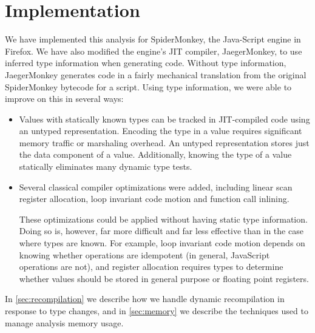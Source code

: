 
\section{Implementation}
\label{sec:implementation}

We have implemented this analysis for SpiderMonkey, the Java-Script engine
in Firefox.
We have also modified the engine's JIT compiler, JaegerMonkey, to use
inferred type information when generating code.
Without type information, JaegerMonkey generates code in a fairly mechanical
translation from the original SpiderMonkey bytecode for a script.
Using type information, we were able to improve on this in several ways:

\begin{itemize}

\item Values with statically known types can be tracked in JIT-compiled code
using an untyped representation.
Encoding the type in a value requires significant memory traffic or
marshaling overhead.
An untyped representation stores just the data component of a value.
Additionally, knowing the type of a value statically eliminates many
dynamic type tests.

\item Several classical compiler optimizations were added,
including linear scan register allocation, loop invariant code motion
and function call inlining.

These optimizations could be applied without
having static type information.
Doing so is, however, far more difficult and far less effective than in
the case where types are known. For example, loop invariant code motion depends
on knowing whether operations
are idempotent (in general, JavaScript operations are not),
and register allocation requires types to determine whether values should
be stored in general purpose or floating point registers.

\end{itemize}

In \Section\ref{sec:recompilation} we describe how we handle dynamic recompilation in
response to type changes, and in \Section\ref{sec:memory} we describe the techniques
used to manage analysis memory usage.

